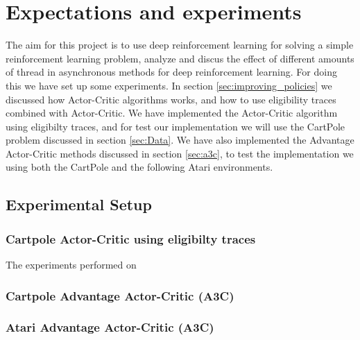 \documentclass[11pt]{article}
\begin{document}

\section{Expectations and experiments}

The aim for this project is to use deep reinforcement learning for solving a simple reinforcement learning problem, analyze and discus the effect of different amounts of thread in asynchronous methods for deep reinforcement learning. For doing this we have set up some experiments. In section \ref{sec:improving_policies} we discussed how Actor-Critic algorithms works, and how to use eligibility traces combined with Actor-Critic. We have implemented the Actor-Critic algorithm using eligibilty traces, and for test our implementation we will use the CartPole problem discussed in section \ref{sec:Data}. We have also implemented the Advantage Actor-Critic methods discussed in section \ref{sec:a3c}, to test the implementation we using both the CartPole and the following Atari environments.

\subsection{Experimental Setup}

\subsubsection{Cartpole Actor-Critic using eligibilty traces}

The experiments performed on 


\subsubsection{Cartpole Advantage Actor-Critic (A3C)}


\subsubsection{Atari Advantage Actor-Critic (A3C)}
\end{document}
